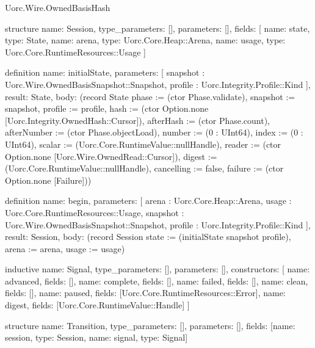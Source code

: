 \begin{lexlean}{Uorc.Wire.OwnedBasisHash}
\begin{semanticmodule}
structure{
  name: Session,
  type_parameters: [],
  parameters: [],
  fields: [
    {name: state, type: State},
    {name: arena, type: Uorc.Core.Heap::Arena},
    {name: usage, type: Uorc.Core.RuntimeResources::Usage}
  ]
}

definition{
  name: initialState,
  parameters: [
    snapshot : Uorc.Wire.OwnedBasisSnapshot::Snapshot,
    profile : Uorc.Integrity.Profile::Kind
  ],
  result: State,
  body: (record State {phase := (ctor Phase.validate), snapshot := snapshot, profile := profile, hash := (ctor Option.none [Uorc.Integrity.OwnedHash::Cursor]), afterHash := (ctor Phase.count), afterNumber := (ctor Phase.objectLoad), number := (0 : UInt64), index := (0 : UInt64), scalar := (Uorc.Core.RuntimeValue::nullHandle), reader := (ctor Option.none [Uorc.Wire.OwnedRead::Cursor]), digest := (Uorc.Core.RuntimeValue::nullHandle), cancelling := false, failure := (ctor Option.none [Failure])})
}

definition{
  name: begin,
  parameters: [
    arena : Uorc.Core.Heap::Arena,
    usage : Uorc.Core.RuntimeResources::Usage,
    snapshot : Uorc.Wire.OwnedBasisSnapshot::Snapshot,
    profile : Uorc.Integrity.Profile::Kind
  ],
  result: Session,
  body: (record Session {state := (initialState snapshot profile), arena := arena, usage := usage})
}

inductive{
  name: Signal,
  type_parameters: [],
  parameters: [],
  constructors: [
    {name: advanced, fields: []},
    {name: complete, fields: []},
    {name: failed, fields: []},
    {name: clean, fields: []},
    {name: paused, fields: [Uorc.Core.RuntimeResources::Error]},
    {name: digest, fields: [Uorc.Core.RuntimeValue::Handle]}
  ]
}

structure{
  name: Transition,
  type_parameters: [],
  parameters: [],
  fields: [{name: session, type: Session}, {name: signal, type: Signal}]
}


\end{semanticmodule}
\end{lexlean}
